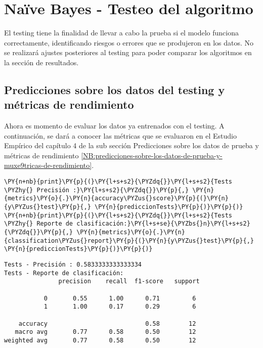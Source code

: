     \hypertarget{nauxefve-bayes---testeo-del-algoritmo}{%
\section{Naïve Bayes - Testeo del algoritmo}\label{nauxefve-bayes---testeo-del-algoritmo}}

	El testing tiene la finalidad de llevar a cabo la prueba si el modelo funciona correctamente, identificando riesgos o errores que se produjeron en los datos. No se realizará ajustes posteriores al testing para poder
comparar los algoritmos en la sección de resultados.

    \hypertarget{predicciones-sobre-los-datos-del-testing-y-muxe9tricas-de-rendimiento}{%
\subsection{Predicciones sobre los datos del testing y métricas de rendimiento}\label{NBT:predicciones-sobre-los-datos-del-testing-y-muxe9tricas-de-rendimiento}}

	Ahora es momento de evaluar los datos ya entrenados con el testing. A continuación, se dará a conocer las métricas que se evaluaron en el Estudio Empírico del capítulo 4  de la sub sección Predicciones sobre los datos de prueba y métricas de rendimiento \ref{NB:predicciones-sobre-los-datos-de-prueba-y-muxe9tricas-de-rendimiento}.

    \begin{tcolorbox}[breakable, size=fbox, boxrule=1pt, pad at break*=1mm,colback=cellbackground, colframe=cellborder]
\begin{Verbatim}[commandchars=\\\{\}]
\PY{n+nb}{print}\PY{p}{(}\PY{l+s+s2}{\PYZdq{}}\PY{l+s+s2}{Tests \PYZhy{} Precisión :}\PY{l+s+s2}{\PYZdq{}}\PY{p}{,} \PY{n}{metrics}\PY{o}{.}\PY{n}{accuracy\PYZus{}score}\PY{p}{(}\PY{n}{y\PYZus{}test}\PY{p}{,} \PY{n}{prediccionTests}\PY{p}{)}\PY{p}{)}
\PY{n+nb}{print}\PY{p}{(}\PY{l+s+s2}{\PYZdq{}}\PY{l+s+s2}{Tests \PYZhy{} Reporte de clasificación:}\PY{l+s+se}{\PYZbs{}n}\PY{l+s+s2}{\PYZdq{}}\PY{p}{,} \PY{n}{metrics}\PY{o}{.}\PY{n}{classification\PYZus{}report}\PY{p}{(}\PY{n}{y\PYZus{}test}\PY{p}{,} \PY{n}{prediccionTests}\PY{p}{)}\PY{p}{)}
\end{Verbatim}
\end{tcolorbox}

    \begin{Verbatim}[commandchars=\\\{\}]
Tests - Precisión : 0.5833333333333334
Tests - Reporte de clasificación:
               precision    recall  f1-score   support

           0       0.55      1.00      0.71         6
           1       1.00      0.17      0.29         6

    accuracy                           0.58        12
   macro avg       0.77      0.58      0.50        12
weighted avg       0.77      0.58      0.50        12

    \end{Verbatim}

